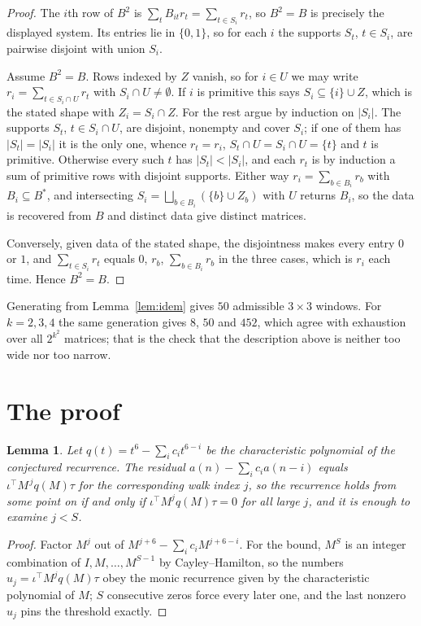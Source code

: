 \documentclass[11pt,a4paper]{article}
\theoremstyle{plain}
\newtheorem{lemma}[theorem]{Lemma}
\theoremstyle{definition}
\begin{document}
\begin{proof}
The $i$th row of $B^2$ is $\sum_t B_{it}r_t=\sum_{t\in S_i}r_t$, so $B^2=B$ is precisely the
displayed system. Its entries lie in $\{0,1\}$, so for each $i$ the supports $S_t$,
$t\in S_i$, are pairwise disjoint with union $S_i$.

Assume $B^2=B$. Rows indexed by $Z$ vanish, so for $i\in U$ we may write
$r_i=\sum_{t\in S_i\cap U}r_t$ with $S_i\cap U\neq\emptyset$. If $i$ is primitive this says
$S_i\subseteq\{i\}\cup Z$, which is the stated shape with $Z_i=S_i\cap Z$. For the rest argue
by induction on $|S_i|$. The supports $S_t$, $t\in S_i\cap U$, are disjoint, nonempty and
cover $S_i$; if one of them has $|S_t|=|S_i|$ it is the only one, whence $r_t=r_i$,
$S_t\cap U=S_i\cap U=\{t\}$ and $t$ is primitive. Otherwise every such $t$ has
$|S_t|<|S_i|$, and each $r_t$ is by induction a sum of primitive rows with disjoint supports.
Either way $r_i=\sum_{b\in B_i}r_b$ with $B_i\subseteq B^{\ast}$, and intersecting
$S_i=\bigsqcup_{b\in B_i}(\{b\}\cup Z_b)$ with $U$ returns $B_i$, so the data is recovered
from $B$ and distinct data give distinct matrices.

Conversely, given data of the stated shape, the disjointness makes every entry $0$ or $1$, and
$\sum_{t\in S_i}r_t$ equals $0$, $r_b$, $\sum_{b\in B_i}r_b$ in the three cases, which is
$r_i$ each time. Hence $B^2=B$.
\end{proof}

Generating from Lemma~\ref{lem:idem} gives $50$ admissible $3\times3$ windows. For
$k=2,3,4$ the same generation gives $8$, $50$ and $452$, which agree with exhaustion over all
$2^{k^2}$ matrices; that is the check that the description above is neither too wide nor too
narrow.

\section{The proof}

\begin{lemma}\label{lem:crit}
Let $q(t)=t^{6}-\sum_i c_it^{6-i}$ be the characteristic polynomial of the
conjectured recurrence. The residual $a(n)-\sum_ic_ia(n-i)$ equals
$\iota^{\!\top}M^{\,j}q(M)\tau$ for the corresponding walk index $j$, so the recurrence
holds from some point on if and only if $\iota^{\!\top}M^{j}q(M)\tau=0$ for all large $j$,
and it is enough to examine $j<S$.
\end{lemma}

\begin{proof}
Factor $M^{j}$ out of $M^{j+6}-\sum_ic_iM^{j+6-i}$. For the bound, $M^{S}$
is an integer combination of $I,M,\dots,M^{S-1}$ by Cayley--Hamilton, so the numbers
$u_j=\iota^{\!\top}M^{j}q(M)\tau$ obey the monic recurrence given by the characteristic
polynomial of $M$; $S$ consecutive zeros force every later one, and the last nonzero $u_j$
pins the threshold exactly.
\end{proof}
\end{document}
